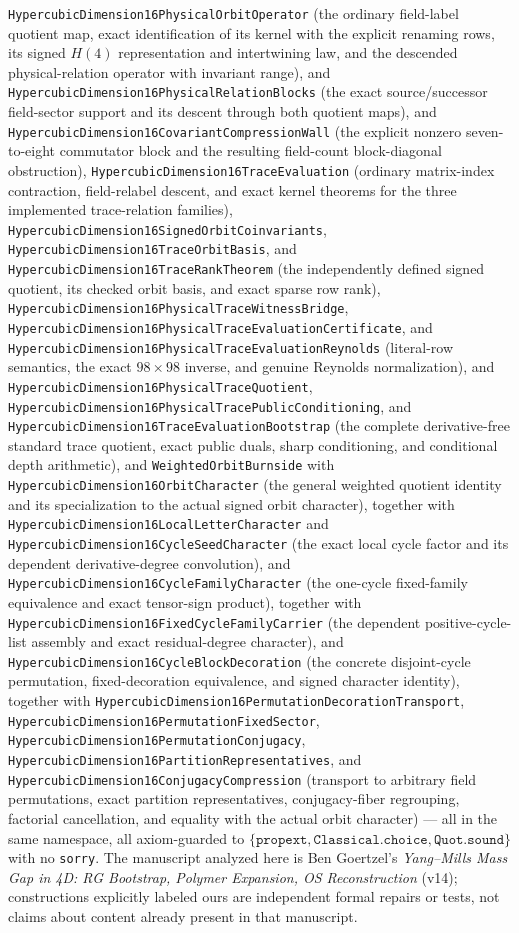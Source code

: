 \documentclass[11pt]{article}
\theoremstyle{definition}
\begin{document}
\texttt{HypercubicDimension16PhysicalOrbitOperator} (the ordinary field-label
quotient map, exact identification of its kernel with the explicit renaming
rows, its signed $H(4)$ representation and intertwining law, and the descended
physical-relation operator with invariant range), and
\texttt{HypercubicDimension16PhysicalRelationBlocks} (the exact
source/successor field-sector support and its descent through both quotient
maps), and \texttt{HypercubicDimension16CovariantCompressionWall} (the
explicit nonzero seven-to-eight commutator block and the resulting
field-count block-diagonal obstruction),
\texttt{HypercubicDimension16TraceEvaluation} (ordinary matrix-index
contraction, field-relabel descent, and exact kernel theorems for the three
implemented trace-relation families),
\texttt{HypercubicDimension16SignedOrbitCoinvariants},
\texttt{HypercubicDimension16TraceOrbitBasis}, and
\texttt{HypercubicDimension16TraceRankTheorem} (the independently defined
signed quotient, its checked orbit basis, and exact sparse row rank),
\texttt{HypercubicDimension16PhysicalTraceWitnessBridge},
\texttt{HypercubicDimension16PhysicalTraceEvaluationCertificate}, and
\texttt{HypercubicDimension16PhysicalTraceEvaluationReynolds} (literal-row
semantics, the exact $98\times98$ inverse, and genuine Reynolds
normalization), and
\texttt{HypercubicDimension16PhysicalTraceQuotient},
\texttt{HypercubicDimension16PhysicalTracePublicConditioning}, and
\texttt{HypercubicDimension16TraceEvaluationBootstrap} (the complete
derivative-free standard trace quotient, exact public duals, sharp
conditioning, and conditional depth arithmetic), and
\texttt{WeightedOrbitBurnside} with
\texttt{HypercubicDimension16OrbitCharacter} (the general weighted quotient
identity and its specialization to the actual signed orbit character),
together with \texttt{HypercubicDimension16LocalLetterCharacter} and
\texttt{HypercubicDimension16CycleSeedCharacter} (the exact local cycle
factor and its dependent derivative-degree convolution), and
\texttt{HypercubicDimension16CycleFamilyCharacter} (the one-cycle fixed-family
equivalence and exact tensor-sign product), together with
\texttt{HypercubicDimension16FixedCycleFamilyCarrier} (the dependent
positive-cycle-list assembly and exact residual-degree character), and
\texttt{HypercubicDimension16CycleBlockDecoration} (the concrete disjoint-cycle
permutation, fixed-decoration equivalence, and signed character identity),
together with \texttt{HypercubicDimension16PermutationDecorationTransport},
\texttt{HypercubicDimension16PermutationFixedSector},
\texttt{HypercubicDimension16PermutationConjugacy},
\texttt{HypercubicDimension16PartitionRepresentatives}, and
\texttt{HypercubicDimension16ConjugacyCompression} (transport to arbitrary
field permutations, exact partition representatives, conjugacy-fiber
regrouping, factorial cancellation, and equality with the actual orbit
character) --- all
in the same namespace,
all axiom-guarded
to $\{\texttt{propext}, \texttt{Classical.choice}, \texttt{Quot.sound}\}$ with
no \texttt{sorry}. The manuscript analyzed here is Ben Goertzel's
\emph{Yang--Mills Mass Gap in 4D: RG Bootstrap, Polymer Expansion, OS
Reconstruction} (v14); constructions explicitly labeled ours are independent
formal repairs or tests, not claims about content already present in that
manuscript.
\end{document}
